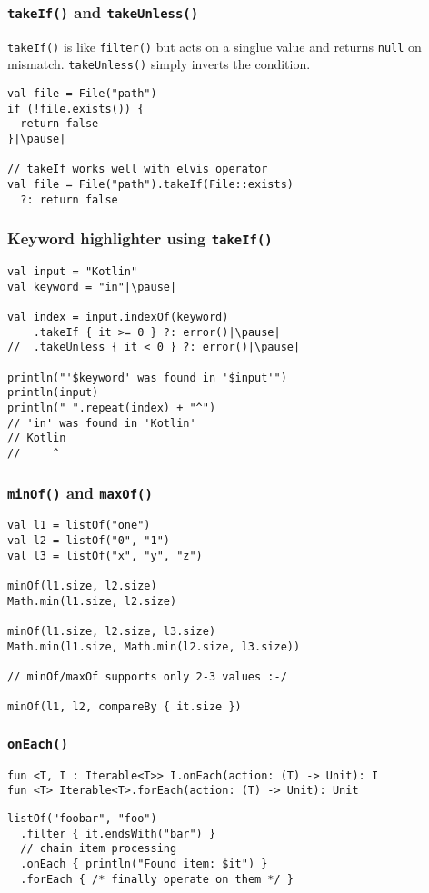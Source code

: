 
\begin{frame}[fragile] \frametitle{\texttt{takeIf()} and \texttt{takeUnless()}}
\texttt{takeIf()} is like \texttt{filter()} but acts on a singlue value and returns \texttt{null} on mismatch. \texttt{takeUnless()} simply inverts the condition.
\begin{lstlisting}
val file = File("path")
if (!file.exists()) {
  return false
}|\pause|

// takeIf works well with elvis operator
val file = File("path").takeIf(File::exists)
  ?: return false
\end{lstlisting}
\end{frame}

\begin{frame}[fragile] \frametitle{Keyword highlighter using \texttt{takeIf()}}
\begin{lstlisting}
val input = "Kotlin"
val keyword = "in"|\pause|

val index = input.indexOf(keyword)
    .takeIf { it >= 0 } ?: error()|\pause|
//  .takeUnless { it < 0 } ?: error()|\pause|

println("'$keyword' was found in '$input'")
println(input)
println(" ".repeat(index) + "^")
// 'in' was found in 'Kotlin'
// Kotlin
//     ^
\end{lstlisting}
\end{frame}


\begin{frame}[fragile] \frametitle{\texttt{minOf()} and \texttt{maxOf()}}
\begin{lstlisting}
val l1 = listOf("one")
val l2 = listOf("0", "1")
val l3 = listOf("x", "y", "z")

minOf(l1.size, l2.size)
Math.min(l1.size, l2.size)

minOf(l1.size, l2.size, l3.size)
Math.min(l1.size, Math.min(l2.size, l3.size))

// minOf/maxOf supports only 2-3 values :-/

minOf(l1, l2, compareBy { it.size })
\end{lstlisting}
\end{frame}

\begin{frame}[fragile] \frametitle{\texttt{onEach()}}
\footnotesize{\texttt{fun <T, I : Iterable<T>> I.onEach(action: (T) -> Unit): I}} \\
\footnotesize{\texttt{fun <T> Iterable<T>.forEach(action: (T) -> Unit): Unit}}
\normalsize{}
\begin{lstlisting}
listOf("foobar", "foo")
  .filter { it.endsWith("bar") }
  // chain item processing
  .onEach { println("Found item: $it") }
  .forEach { /* finally operate on them */ }
\end{lstlisting}
\end{frame}

